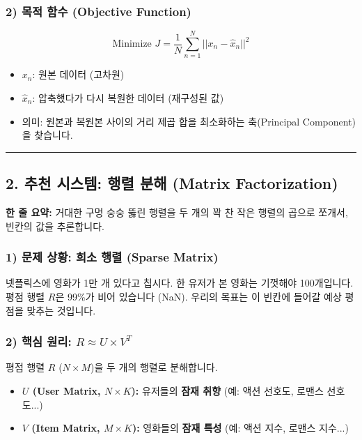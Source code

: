 \documentclass[11pt,a4paper]{book}
\theoremstyle{definition}
\begin{document}
\subsubsection*{2) 목적 함수 (Objective Function)}
$$ \text{Minimize } J = \frac{1}{N} \sum_{n=1}^{N} || x_n - \hat{x}_n ||^2 $$
\begin{itemize}
    \item $x_n$: 원본 데이터 (고차원)
    \item $\hat{x}_n$: 압축했다가 다시 복원한 데이터 (재구성된 값)
    \item 의미: 원본과 복원본 사이의 거리 제곱 합을 최소화하는 축(Principal Component)을 찾습니다.
\end{itemize}

\vspace{0.5cm}\hrule\vspace{0.5cm}

\subsection{2. 추천 시스템: 행렬 분해 (Matrix Factorization)}


\begin{conceptbox}[title={개념 2: 빈칸 채우기 퍼즐}]
\textbf{한 줄 요약:} 거대한 구멍 숭숭 뚫린 행렬을 두 개의 꽉 찬 작은 행렬의 곱으로 쪼개서, 빈칸의 값을 추론합니다.
\end{conceptbox}

\subsubsection*{1) 문제 상황: 희소 행렬 (Sparse Matrix)}
넷플릭스에 영화가 1만 개 있다고 칩시다. 한 유저가 본 영화는 기껏해야 100개입니다.
평점 행렬 $R$은 99\%가 비어 있습니다 (NaN). 우리의 목표는 이 빈칸에 들어갈 예상 평점을 맞추는 것입니다.

\subsubsection*{2) 핵심 원리: $R \approx U \times V^T$}
평점 행렬 $R$ ($N \times M$)을 두 개의 행렬로 분해합니다.
\begin{itemize}
    \item \textbf{$U$ (User Matrix, $N \times K$):} 유저들의 \textbf{잠재 취향} (예: 액션 선호도, 로맨스 선호도...)
    \item \textbf{$V$ (Item Matrix, $M \times K$):} 영화들의 \textbf{잠재 특성} (예: 액션 지수, 로맨스 지수...)
\end{itemize}
\end{document}
